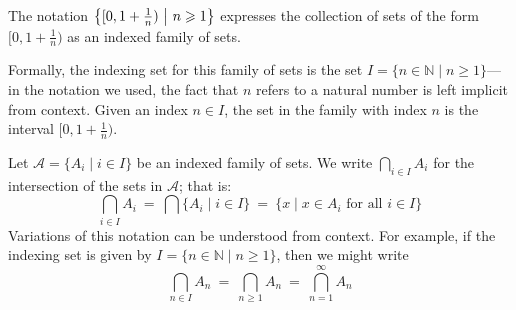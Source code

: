 \begin{example}
\label{exIndexedFamilyOfHalfOpenIntervals}
The notation $\left\{ [0, 1+\frac{1}{n}) ~\middle|~ n \geqslant 1 \right\}$ expresses the collection of sets of the form $[0,1+\frac{1}{n})$ as an indexed family of sets.

Formally, the indexing set for this family of sets is the set $I = \{ n \in \mathbb{N} \mid n \ge 1 \}$---in the notation we used, the fact that $n$ refers to a natural number is left implicit from context. Given an index $n \in I$, the set in the family with index $n$ is the interval $[0,1+\frac{1}{n})$.
\end{example}

\begin{notation}
\label{ntnIntersectionIndexed}
Let $\mathcal{A} = \{ A_i \mid i \in I \}$ be an indexed family of sets. We write $\displaystyle \bigcap_{i \in I} A_i$ for the intersection of the sets in $\mathcal{A}$; that is:
\[ \bigcap_{i \in I} A_i ~=~ \bigcap \{ A_i \mid i \in I \} ~=~ \{ x \mid x \in A_i \text{ for all } i \in I \} \]
Variations of this notation can be understood from context. For example, if the indexing set is given by $I = \{ n \in \mathbb{N} \mid n \ge 1 \}$, then we might write
\[ \bigcap_{n \in I} A_n ~=~ \bigcap_{n \ge 1} A_n ~=~ \bigcap_{n=1}^{\infty} A_n \]
\end{notation}

